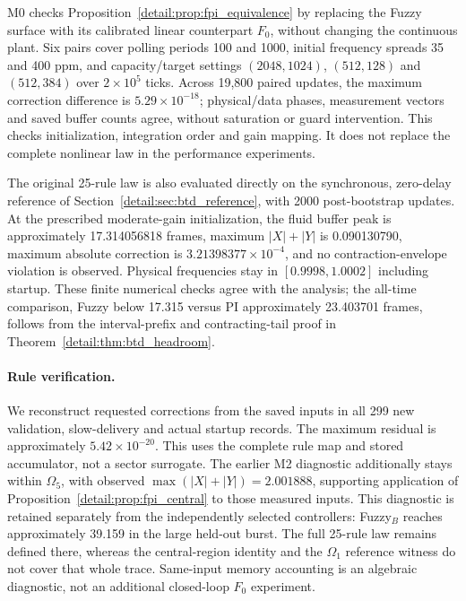 M0 checks Proposition~\ref{detail:prop:fpi_equivalence} by replacing the Fuzzy
surface with its calibrated linear counterpart $F_0$, without changing
the continuous plant. Six pairs cover polling periods 100 and 1000,
initial frequency spreads 35 and 400 ppm, and capacity/target settings
$(2048,1024)$, $(512,128)$ and $(512,384)$ over $2\times10^5$ ticks.
Across 19,800 paired updates, the maximum correction difference is
$5.29\times10^{-18}$; physical/data phases, measurement vectors and
saved buffer counts agree, without saturation or guard intervention.
This checks initialization, integration order and gain mapping. It does
not replace the complete nonlinear law in the performance experiments.

The original 25-rule law is also evaluated directly on the synchronous,
zero-delay reference of Section~\ref{detail:sec:btd_reference}, with 2000
post-bootstrap updates. At the prescribed moderate-gain initialization,
the fluid buffer peak is approximately 17.314056818 frames, maximum
$|X|+|Y|$ is 0.090130790, maximum absolute correction is
$3.21398377\times10^{-4}$, and no contraction-envelope violation is
observed. Physical frequencies stay in $[0.9998,1.0002]$ including
startup. These finite numerical checks agree with the analysis; the
all-time comparison, Fuzzy below 17.315 versus PI approximately
23.403701 frames, follows from the interval-prefix and contracting-tail
proof in Theorem~\ref{detail:thm:btd_headroom}.

\paragraph{Rule verification.}
We reconstruct requested corrections from the saved inputs in all 299
new validation, slow-delivery and actual startup records. The maximum
residual is approximately $5.42\times10^{-20}$. This uses the complete
rule map and stored accumulator, not a sector surrogate. The earlier
M2 diagnostic additionally stays within $\Omega_5$, with observed
$\max(|X|+|Y|)=2.001888$, supporting application of
Proposition~\ref{detail:prop:fpi_central} to those measured inputs. This
diagnostic is retained separately from the independently selected
controllers: Fuzzy$_B$ reaches approximately 39.159 in the large
held-out burst. The full 25-rule law remains defined there, whereas
the central-region identity and the $\Omega_1$ reference witness do
not cover that whole trace. Same-input memory accounting is an
algebraic diagnostic, not an additional closed-loop $F_0$ experiment.

